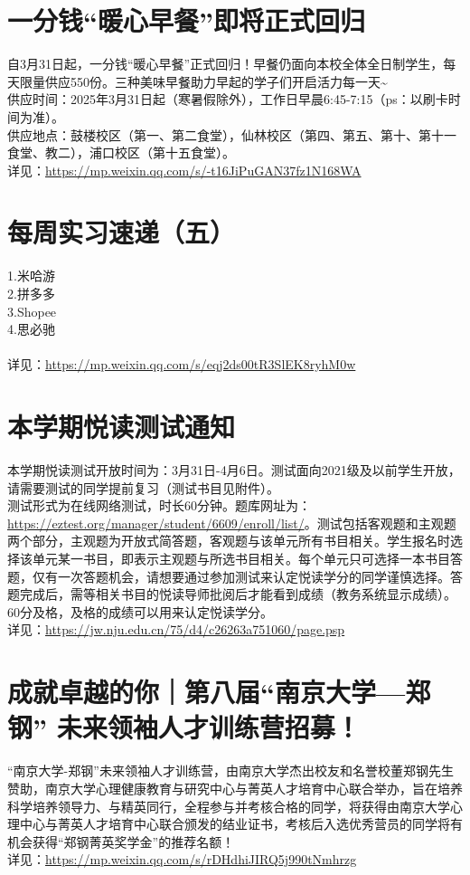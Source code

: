 \documentclass[letterpaper, 12pt]{article}
\begin{document}
\begin{multicols}{2}
\section{一分钱“暖心早餐”即将正式回归}
自3月31日起，一分钱“暖心早餐”正式回归！早餐仍面向本校全体全日制学生，每天限量供应550份。三种美味早餐助力早起的学子们开启活力每一天\textasciitilde{}
\\供应时间：2025年3月31日起（寒暑假除外），工作日早晨6:45-7:15（ps：以刷卡时间为准）。
\\供应地点：鼓楼校区（第一、第二食堂），仙林校区（第四、第五、第十、第十一食堂、教二），浦口校区（第十五食堂）。
\\详见：\url{https://mp.weixin.qq.com/s/-t16JiPuGAN37fz1N168WA}

\section{每周实习速递（五）}
1.米哈游
\\2.拼多多
\\3.Shopee
\\4.思必驰
\\
\\详见：\url{https://mp.weixin.qq.com/s/eqj2ds00tR3SlEK8ryhM0w}

\section{本学期悦读测试通知}
本学期悦读测试开放时间为：3月31日-4月6日。测试面向2021级及以前学生开放，请需要测试的同学提前复习（测试书目见附件）。
\\测试形式为在线网络测试，时长60分钟。题库网址为：\url{https://eztest.org/manager/student/6609/enroll/list/}。测试包括客观题和主观题两个部分，主观题为开放式简答题，客观题与该单元所有书目相关。学生报名时选择该单元某一书目，即表示主观题与所选书目相关。每个单元只可选择一本书目答题，仅有一次答题机会，请想要通过参加测试来认定悦读学分的同学谨慎选择。答题完成后，需等相关书目的悦读导师批阅后才能看到成绩（教务系统显示成绩）。60分及格，及格的成绩可以用来认定悦读学分。
\\详见：\url{https://jw.nju.edu.cn/75/d4/c26263a751060/page.psp}


\section{成就卓越的你｜第八届“南京大学—郑钢” 未来领袖人才训练营招募！}
“南京大学-郑钢”未来领袖人才训练营，由南京大学杰出校友和名誉校董郑钢先生赞助，南京大学心理健康教育与研究中心与菁英人才培育中心联合举办，旨在培养科学培养领导力、与精英同行，全程参与并考核合格的同学，将获得由南京大学心理中心与菁英人才培育中心联合颁发的结业证书，考核后入选优秀营员的同学将有机会获得“郑钢菁英奖学金”的推荐名额！
\\详见：\url{https://mp.weixin.qq.com/s/rDHdhiJIRQ5j990tNmhrzg}


\end{multicols}
\end{document}

